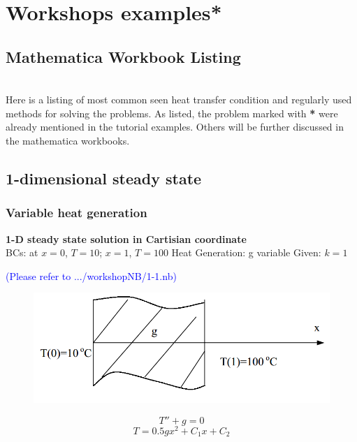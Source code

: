 \appendix
\renewcommand{\thechapter}{\arabic{chapter}}
\renewcommand{\thesection}{\arabic{section}}

\chapter{Workshops examples*}

\newcommand{\myWSEgPath}[1] {
\label{example:#1}
  \textcolor{blue} {(Please refer to .../workshopNB/#1.nb)}}

\section{Mathematica Workbook Listing}
~\\Here is a listing of most common seen heat transfer condition and regularly used methods for solving the problems. As listed, the problem marked with \textbf{*} were already mentioned in the tutorial examples. Others will be further discussed in the mathematica workbooks.

\section{1-dimensional steady state}
\subsection{Variable heat generation}
\begin{example}
\textbf{1-D steady state solution in Cartisian coordinate}\\
BCs: at $x=0$, $T=10$; 
$x=1$, $T=100$ Heat Generation: g variable Given: $k=1$
\myWSEgPath{1-1}
\begin{figure}[H]
  \centering
    \includegraphics[scale=0.5]{figures/appendixA/1}
\end{figure}
$$T''+g=0$$
$$T=0.5gx^2+C_1x+C_2$$
\end{example}

